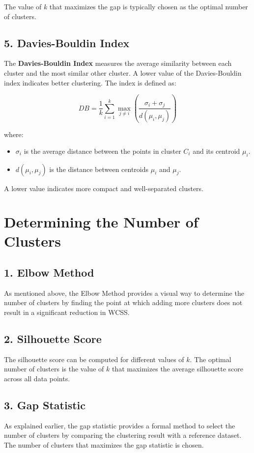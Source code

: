 \documentclass{article}
\begin{document}
The value of $k$ that maximizes the gap is typically chosen as the optimal number of clusters.

\subsection{5. Davies-Bouldin Index}
The \textbf{Davies-Bouldin Index} measures the average similarity between each cluster and the most similar other cluster. A lower value of the Davies-Bouldin index indicates better clustering. The index is defined as:

\[
DB = \frac{1}{k} \sum_{i=1}^{k} \max_{j \neq i} \left( \frac{\sigma_i + \sigma_j}{d(\mu_i, \mu_j)} \right)
\]

where:
\begin{itemize}
    \item $\sigma_i$ is the average distance between the points in cluster $C_i$ and its centroid $\mu_i$.
    \item $d(\mu_i, \mu_j)$ is the distance between centroids $\mu_i$ and $\mu_j$.
\end{itemize}

A lower value indicates more compact and well-separated clusters.

\section{Determining the Number of Clusters}

\subsection{1. Elbow Method}
As mentioned above, the Elbow Method provides a visual way to determine the number of clusters by finding the point at which adding more clusters does not result in a significant reduction in WCSS.

\subsection{2. Silhouette Score}
The silhouette score can be computed for different values of $k$. The optimal number of clusters is the value of $k$ that maximizes the average silhouette score across all data points.

\subsection{3. Gap Statistic}
As explained earlier, the gap statistic provides a formal method to select the number of clusters by comparing the clustering result with a reference dataset. The number of clusters that maximizes the gap statistic is chosen.
\end{document}
